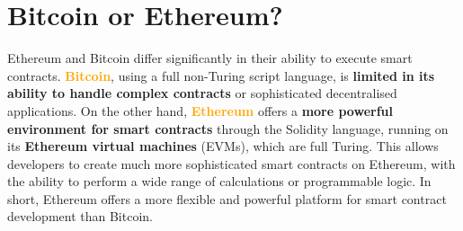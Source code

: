 \section{Bitcoin or Ethereum? \texorpdfstring{\faBitcoin}{} \ \texorpdfstring{\faEthereum}{}}

Ethereum and Bitcoin differ significantly in their ability to execute smart contracts. \textbf{\textcolor{Orange}{Bitcoin}}, using a full non-Turing script language, is \textbf{limited in its ability to handle complex contracts} or sophisticated decentralised applications. On the other hand, \textbf{\textcolor{Orange}{Ethereum}} offers a \textbf{more powerful environment for smart contracts} through the Solidity language, running on its \textbf{Ethereum virtual machines} (EVMs), which are full Turing. This allows developers to create much more sophisticated smart contracts on Ethereum, with the ability to perform a wide range of calculations or programmable logic. In short, Ethereum offers a more flexible and powerful platform for smart contract development than Bitcoin.
